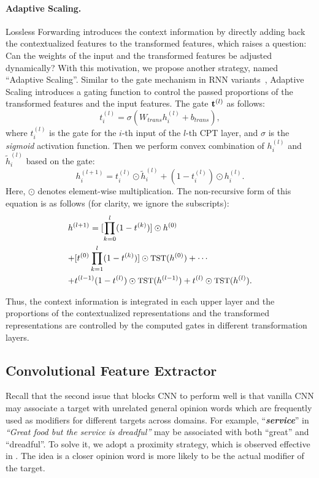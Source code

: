 \documentclass[11pt,a4paper]{article}
\begin{document}
\paragraph{Adaptive Scaling.}
Lossless Forwarding introduces the context information by directly adding back the contextualized features to the transformed features, which raises a question: Can the weights of the input and the transformed features be adjusted dynamically? With this motivation, we propose another strategy, named ``Adaptive Scaling''. Similar to the gate mechanism in RNN variants~\cite{jozefowicz2015empirical}, Adaptive Scaling introduces a gating function to control the passed proportions of the transformed features and the input features. The gate $\mathrm{\bf t}^{(l)}$ as follows:
\begin{equation}
    t^{(l)}_i = \sigma (W_{trans} h^{(l)}_i + b_{trans}),
\end{equation}
where $t^{(l)}_i$ is the gate for the $i$-th input of the $l$-th CPT layer, and $\sigma$ is the \textit{sigmoid} activation function. Then we perform convex combination of $h^{(l)}_i$ and $\tilde{h}^{(l)}_i$ based on the gate: \begin{equation}\label{eq:highway}
    h^{(l+1)}_i = t^{(l)}_i \odot \tilde{h}^{(l)}_i + (1 - t^{(l)}_i) \odot h^{(l)}_i.
\end{equation}
Here, $\odot$ denotes element-wise multiplication. The non-recursive form of this equation is as follows (for clarity, we ignore the subscripts):
\begin{equation}
\label{eq:highway_unfold}
\begin{split}
    &\small{h^{(l+1)} = [\prod^{l}_{k=0} (1-t^{(k)})]\odot h^{(0)}} \\ 
   & \small{ + [t^{(0)}\prod^{l}_{k=1} (1-t^{(k)})]\odot \text{TST}(h^{(0)}) + \cdots} \\
    &\small{+ t^{(l-1)} (1-t^{(l)}) \odot \text{TST}(h^{(l-1)}) 
    + t^{(l)} \odot \text{TST}(h^{(l)}).} \nonumber
\end{split}
\end{equation}

Thus, the context information is integrated in each upper layer and the proportions of the contextualized representations and the transformed representations are controlled by the computed gates in different transformation layers.

\subsection{Convolutional Feature Extractor}
Recall that the second issue that blocks CNN to perform well is that vanilla CNN may associate a target with unrelated general opinion words which are frequently used as modifiers for different targets across domains. For example, ``\textit{\textbf{service}}'' in \textit{``Great food but the service is dreadful''} may be associated with both ``great'' and ``dreadful''. To solve it, we adopt a proximity strategy, which is observed effective in \cite{chen-EtAl:2017:EMNLP20171,li2017deep}. The idea is a closer opinion word is more likely to be the actual modifier of the target. 
\end{document}
